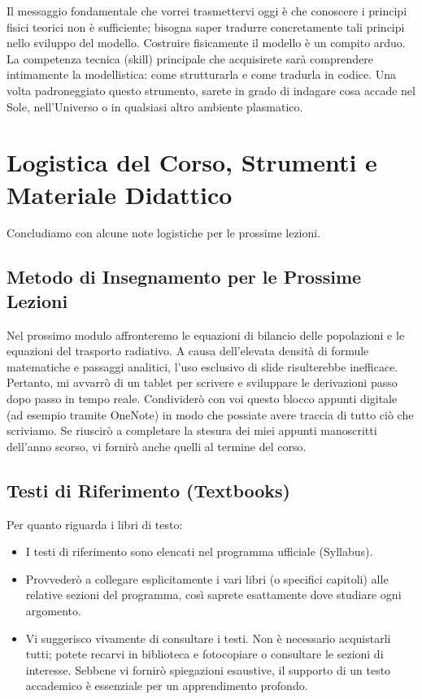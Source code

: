     Il messaggio fondamentale che vorrei trasmettervi oggi è che conoscere i principi fisici teorici non è sufficiente; bisogna saper tradurre concretamente tali principi nello sviluppo del modello. Costruire fisicamente il modello è un compito arduo.
    La competenza tecnica (skill) principale che acquisirete sarà comprendere intimamente la modellistica: come strutturarla e come tradurla in codice. Una volta padroneggiato questo strumento, sarete in grado di indagare cosa accade nel Sole, nell'Universo o in qualsiasi altro ambiente plasmatico.

\section{Logistica del Corso, Strumenti e Materiale Didattico}

Concludiamo con alcune note logistiche per le prossime lezioni.

    \subsection{Metodo di Insegnamento per le Prossime Lezioni}
    Nel prossimo modulo affronteremo le equazioni di bilancio delle popolazioni e le equazioni del trasporto radiativo. A causa dell'elevata densità di formule matematiche e passaggi analitici, l'uso esclusivo di slide risulterebbe inefficace. Pertanto, mi avvarrò di un tablet per scrivere e sviluppare le derivazioni passo dopo passo in tempo reale.
    Condividerò con voi questo blocco appunti digitale (ad esempio tramite OneNote) in modo che possiate avere traccia di tutto ciò che scriviamo. Se riuscirò a completare la stesura dei miei appunti manoscritti dell'anno scorso, vi fornirò anche quelli al termine del corso.
    
    \subsection{Testi di Riferimento (Textbooks)}
    
    Per quanto riguarda i libri di testo:
    \begin{itemize}
        \item I testi di riferimento sono elencati nel programma ufficiale (Syllabus).
        \item Provvederò a collegare esplicitamente i vari libri (o specifici capitoli) alle relative sezioni del programma, così saprete esattamente dove studiare ogni argomento.
        \item Vi suggerisco vivamente di consultare i testi. Non è necessario acquistarli tutti; potete recarvi in biblioteca e fotocopiare o consultare le sezioni di interesse. Sebbene vi fornirò spiegazioni esaustive, il supporto di un testo accademico è essenziale per un apprendimento profondo.
    \end{itemize}
    
